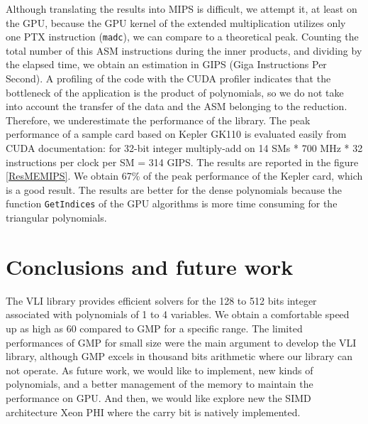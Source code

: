\documentclass[oribibl]{llncs2e/llncs}
\begin{document}
Although translating the results into MIPS is difficult, we attempt it, at least on the GPU, because the GPU kernel of the extended multiplication utilizes only one PTX instruction (\texttt{madc}), we can compare to a theoretical peak.
 Counting the total number of  this ASM instructions during  the inner products, and dividing by the elapsed time, we obtain an estimation in GIPS (Giga Instructions Per Second). A  profiling of the code with the CUDA profiler indicates that the bottleneck of the application is the product of polynomials, so we do not take into account   the transfer of the data and the ASM belonging  to the reduction. Therefore, we underestimate the performance of the library.
The peak performance of  a sample card based on Kepler GK110 is evaluated easily from CUDA documentation: for 32-bit integer multiply-add on 14 SMs * 700 MHz * 32 instructions per clock per SM = 314 GIPS. The results are reported in the figure \ref{ResMEMIPS}. We obtain 67\% of the peak performance of the Kepler card, which is a good result. The results are better for the dense polynomials because the function \texttt{GetIndices}  of the GPU algorithms is more time consuming for the triangular polynomials.

\section{Conclusions and future work}

The VLI library provides efficient solvers for the 128 to 512 bits integer associated with polynomials of 1 to 4 variables. We obtain a comfortable speed up as high as  60 compared 
to GMP for a specific range. The limited performances of GMP for small size were the main argument to develop the VLI library, although GMP excels in thousand bits arithmetic where our library can not operate. 
As future work, we would like to implement, new kinds of polynomials, and a better management  of  the memory to maintain the performance on GPU. And then, we would like explore new  the SIMD architecture Xeon PHI 
where the carry bit is natively implemented.



\end{document}
